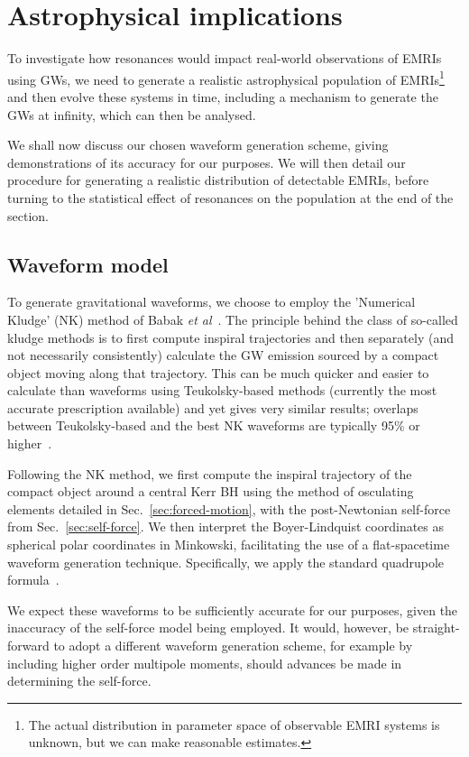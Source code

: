 \documentclass[aps,prd,amsfonts,amssymb,amsmath,nofootinbib,reprint,showpacs]{revtex4}
\newcommand{\secref}[1]{Sec.\ \ref{sec:#1}}
\begin{document}
\section{Astrophysical implications}

To investigate how resonances would impact real-world observations of EMRIs using GWs, we need to generate a realistic astrophysical population of EMRIs\footnote{The actual distribution in parameter space of observable EMRI systems is unknown, but we can make reasonable estimates.} and then evolve these systems in time, including a mechanism to generate the GWs at infinity, which can then be analysed.

We shall now discuss our chosen waveform generation scheme, giving demonstrations of its accuracy for our purposes. We will then detail our procedure for generating a realistic distribution of detectable EMRIs, before turning to the statistical effect of resonances on the population at the end of the section.

\subsection{Waveform model}

To generate gravitational waveforms, we choose to employ the 'Numerical Kludge' (NK) method of Babak \emph{et al}~\cite{Babak2007}. The principle behind the class of so-called kludge methods is to first compute inspiral trajectories and then separately (and not necessarily consistently) calculate the GW emission sourced by a compact object moving along that trajectory. This can be much quicker and easier to calculate than waveforms using Teukolsky-based methods (currently the most accurate prescription available) and yet gives very similar results; overlaps between Teukolsky-based and the best NK waveforms are typically 95\% or higher~\cite{Babak2007}.

Following the NK method, we first compute the inspiral trajectory of the compact object around a central Kerr BH using the method of osculating elements detailed in \secref{forced-motion}, with the post-Newtonian self-force from \secref{self-force}. We then interpret the Boyer-Lindquist coordinates as spherical polar coordinates in Minkowski, facilitating the use of a flat-spacetime waveform generation technique. Specifically, we apply the standard quadrupole formula~\cite{Misner1973}.

We expect these waveforms to be sufficiently accurate for our purposes, given the inaccuracy of the self-force model being employed. It would, however, be straight-forward to adopt a different waveform generation scheme, for example by including higher order multipole moments, should advances be made in determining the self-force.
\end{document}
